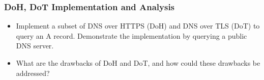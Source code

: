 \documentclass[11pt]{article}
\makeatletter
\providecommand{\tightlist}{%
      \setlength{\itemsep}{0pt}\setlength{\parskip}{0pt}}
\newcommand{\boxspacing}{\kern\kvtcb@left@rule\kern\kvtcb@boxsep}
\newcommand{\prompt}[4]{
        {\ttfamily\llap{{\color{#2}[#3]:\hspace{3pt}#4}}\vspace{-\baselineskip}}
    }
\makeatother
\begin{document}
\hypertarget{doh-dot-implementation-and-analysis}{%
\subsubsection{DoH, DoT Implementation and
Analysis}\label{doh-dot-implementation-and-analysis}}

\begin{itemize}
\tightlist
\item
  Implement a subset of DNS over HTTPS (DoH) and DNS over TLS (DoT) to
  query an A record. Demonstrate the implementation by querying a public
  DNS server.
\item
  What are the drawbacks of DoH and DoT, and how could these drawbacks
  be addressed?
\end{itemize}

    \begin{tcolorbox}[breakable, size=fbox, boxrule=1pt, pad at break*=1mm,colback=cellbackground, colframe=cellborder]
\prompt{In}{incolor}{ }{\boxspacing}
\begin{Verbatim}[commandchars=\\\{\}]

\end{Verbatim}
\end{tcolorbox}


    
    
    
\end{document}
